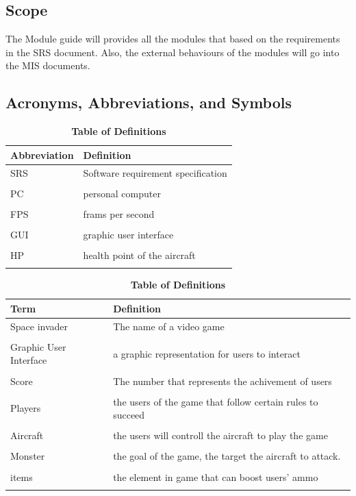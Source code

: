 \documentclass[12pt]{article}
\begin{document}
\subsection{Scope}
The Module guide will provides all the modules that based on the requirements in the SRS document. Also, the external behaviours of the modules will go into the MIS documents.
\newpage
\subsection{Acronyms, Abbreviations, and Symbols}
	
\begin{table}[hbp]
\caption{\textbf{Table of Abbreviations}}

\begin{tabularx}{\textwidth}{p{3cm}X}
\toprule
\textbf{Abbreviation} & \textbf{Definition} \\
\midrule
SRS & Software requirement specification\\\\
PC & personal computer\\\\
FPS & frams per second\\\\
GUI & graphic user interface\\\\
HP & health point of the aircraft\\\\

\bottomrule
\end{tabularx}



\caption{\textbf{Table of Definitions}}

\begin{tabularx}{\textwidth}{p{3cm}X}
\toprule
\textbf{Term} & \textbf{Definition}\\
\midrule
Space invader & The name of a video game\\\\
Graphic User Interface & a graphic representation for users to interact\\\\
Score & The number that represents the achivement of users\\\\
Players & the users of the game that follow certain rules to succeed\\\\
Aircraft & the users will controll the aircraft to play the game\\\\
Monster & the goal of the game, the target the aircraft to attack.\\\\
items & the element in game that can boost users' ammo\\\\
\bottomrule
\end{tabularx}

\end{table}	
\end{document}
